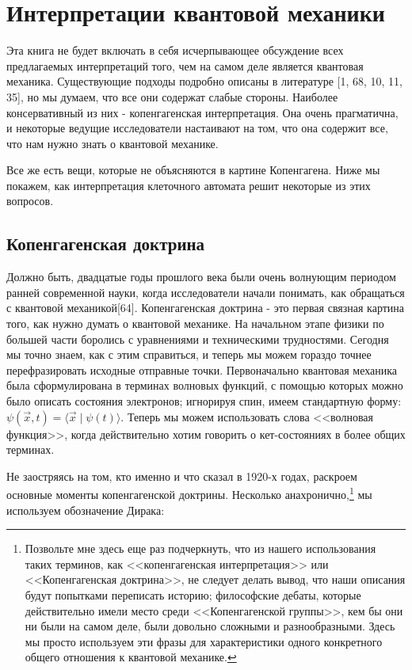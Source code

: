 \documentclass[main.tex]{subfiles}
\begin{document}
\section{Интерпретации квантовой механики}\label{ch3}

Эта книга не будет включать в себя исчерпывающее обсуждение всех предлагаемых интерпретаций того, чем на самом деле является квантовая механика. Существующие подходы подробно описаны в литературе [1, 68, 10, 11, 35], но мы думаем, что все они содержат слабые стороны. Наиболее консервативный из них - копенгагенская интерпретация. Она очень прагматична, и некоторые ведущие исследователи настаивают на том, что она содержит все, что нам нужно знать о квантовой механике.

Все же есть вещи, которые не объясняются в картине Копенгагена. Ниже мы покажем, как интерпретация клеточного автомата решит некоторые из этих вопросов.


\subsection{Копенгагенская доктрина}\label{ch3.1}

Должно быть, двадцатые годы прошлого века были очень волнующим периодом ранней современной науки, когда исследователи начали понимать, как обращаться с квантовой механикой[64]. Копенгагенская доктрина - это первая связная картина того, как нужно думать о квантовой механике. На начальном этапе физики по большей части боролись с уравнениями и техническими трудностями. Сегодня мы точно знаем, как с этим справиться, и теперь мы можем гораздо точнее перефразировать исходные отправные точки. Первоначально квантовая механика была сформулирована в терминах волновых функций, с помощью которых можно было описать состояния электронов; игнорируя спин, имеем стандартную форму: $\psi(\vec x, t) = \langle\vec x\mid\psi(t)\rangle$. Теперь мы можем использовать слова <<волновая функция>>, когда действительно хотим говорить о кет-состояниях в более общих терминах.

Не заостряясь на том, кто именно и что сказал в 1920-х годах, раскроем основные моменты копенгагенской доктрины. Несколько анахронично,\footnote{Позвольте мне здесь еще раз подчеркнуть, что из нашего использования таких терминов, как <<копенгагенская интерпретация>> или <<Копенгагенская доктрина>>, не следует делать вывод, что наши описания будут попытками переписать историю; философские дебаты, которые действительно имели место среди <<Копенгагенской группы>>, кем бы они ни были на самом деле, были довольно сложными и разнообразными. Здесь мы просто используем эти фразы для характеристики одного конкретного общего отношения к квантовой механике.} мы используем обозначение Дирака:
\end{document}

